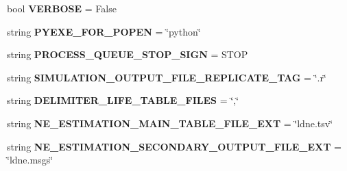 \begin{DoxyCompactItemize}
\item 
bool {\bfseries V\+E\+R\+B\+O\+SE} = False\hypertarget{namespacenegui_1_1pgutilities_a274572b1b2788c24df3e269bc2a3f1f7}{}\label{namespacenegui_1_1pgutilities_a274572b1b2788c24df3e269bc2a3f1f7}

\item 
string {\bfseries P\+Y\+E\+X\+E\+\_\+\+F\+O\+R\+\_\+\+P\+O\+P\+EN} = \char`\"{}python\char`\"{}\hypertarget{namespacenegui_1_1pgutilities_aa64de6ad83c538201adc8d01ab1db845}{}\label{namespacenegui_1_1pgutilities_aa64de6ad83c538201adc8d01ab1db845}

\item 
string {\bfseries P\+R\+O\+C\+E\+S\+S\+\_\+\+Q\+U\+E\+U\+E\+\_\+\+S\+T\+O\+P\+\_\+\+S\+I\+GN} = \textquotesingle{}S\+T\+OP\textquotesingle{}\hypertarget{namespacenegui_1_1pgutilities_aed436e1fc2eb29963ea30b17e614fd04}{}\label{namespacenegui_1_1pgutilities_aed436e1fc2eb29963ea30b17e614fd04}

\item 
string {\bfseries S\+I\+M\+U\+L\+A\+T\+I\+O\+N\+\_\+\+O\+U\+T\+P\+U\+T\+\_\+\+F\+I\+L\+E\+\_\+\+R\+E\+P\+L\+I\+C\+A\+T\+E\+\_\+\+T\+AG} = \char`\"{}.r\char`\"{}\hypertarget{namespacenegui_1_1pgutilities_aeca2401751f6dc9cd4acbe9765271e20}{}\label{namespacenegui_1_1pgutilities_aeca2401751f6dc9cd4acbe9765271e20}

\item 
string {\bfseries D\+E\+L\+I\+M\+I\+T\+E\+R\+\_\+\+L\+I\+F\+E\+\_\+\+T\+A\+B\+L\+E\+\_\+\+F\+I\+L\+ES} = \char`\"{},\char`\"{}\hypertarget{namespacenegui_1_1pgutilities_ad2dc8f53cd27db093fc7f1227367d833}{}\label{namespacenegui_1_1pgutilities_ad2dc8f53cd27db093fc7f1227367d833}

\item 
string {\bfseries N\+E\+\_\+\+E\+S\+T\+I\+M\+A\+T\+I\+O\+N\+\_\+\+M\+A\+I\+N\+\_\+\+T\+A\+B\+L\+E\+\_\+\+F\+I\+L\+E\+\_\+\+E\+XT} = \char`\"{}ldne.\+tsv\char`\"{}\hypertarget{namespacenegui_1_1pgutilities_aa78d8e8004985b127644b8c985a2b551}{}\label{namespacenegui_1_1pgutilities_aa78d8e8004985b127644b8c985a2b551}

\item 
string {\bfseries N\+E\+\_\+\+E\+S\+T\+I\+M\+A\+T\+I\+O\+N\+\_\+\+S\+E\+C\+O\+N\+D\+A\+R\+Y\+\_\+\+O\+U\+T\+P\+U\+T\+\_\+\+F\+I\+L\+E\+\_\+\+E\+XT} = \char`\"{}ldne.\+msgs\char`\"{}\hypertarget{namespacenegui_1_1pgutilities_adfda5d480a10cf273a287871a5aba972}{}\label{namespacenegui_1_1pgutilities_adfda5d480a10cf273a287871a5aba972}


\end{DoxyCompactItemize}
